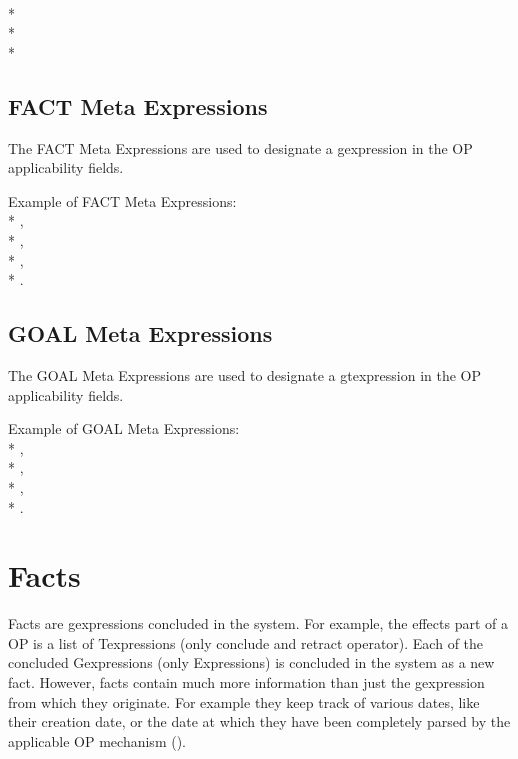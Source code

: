\noindent
{} \\*
 \\*
 \\*



\subsection{FACT Meta Expressions}

The FACT Meta Expressions are used to designate a gexpression in the OP
applicability fields.

Example of FACT Meta Expressions:\\*
,\\*
,\\*
,\\*
.

\subsection{GOAL Meta Expressions}

The GOAL Meta Expressions are used to designate a gtexpression in the OP
applicability fields.

Example of GOAL Meta Expressions:\\*
,\\*
,\\*
,\\*
.

\section{Facts}

Facts are gexpressions concluded in the system. For example, the effects part
of a OP is a list of Texpressions (only conclude and retract operator). Each of
the concluded Gexpressions (only Expressions) is concluded in the system as a
new fact. However, facts contain much more information than just the
gexpression from which they originate. For example they keep track of various
dates, like their creation date, or the date at which they have been completely
parsed by the applicable OP mechanism ().

